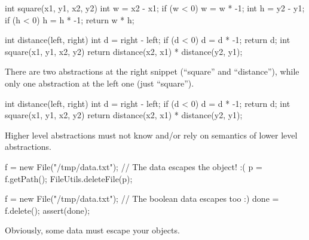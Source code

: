 \documentclass{article}
\begin{document}
\begin{pptWide}{2}
{\small\begin{ffcode}
int square(x1, y1, x2, y2) {
  int w = x2 - x1;
  if (w < 0) { w = w * -1; }
  int h = y2 - y1;
  if (h < 0) { h = h * -1; }
  return w * h;
}
\end{ffcode}
}
\par\columnbreak\par
{\small\begin{ffcode}
int distance(left, right) {
  int d = right - left;
  if (d < 0) { d = d * -1; }
  return d;
}
int square(x1, y1, x2, y2) {
  return distance(x2, x1)
    * distance(y2, y1);
}
\end{ffcode}
}
\end{pptWide}\par
There are two abstractions at the right snippet (``square'' and ``distance''), while only one abstraction at the left one (just ``square'').
\plush{}

\begin{pptWide}{2}
{\small\begin{ffcode}
int distance(left, right) {
  int d = right - left;
  if (d < 0) { d = d * -1; }
  return d;
}
int square(x1, y1, x2, y2) {
  return distance(x2, x1)
    * distance(y2, y1);
}
\end{ffcode}
}
\par\columnbreak\par
{}
\end{pptWide}\par
Higher level abstractions must not know and/or rely on semantics of lower level abstractions.
\plush{}

\begin{pptWide}{2}
{\small\begin{ffcode}
f = new File("/tmp/data.txt");
// The data escapes the object! :(
p = f.getPath();
FileUtils.deleteFile(p);
\end{ffcode}
}
\par\columnbreak\par
{\small\begin{ffcode}
f = new File("/tmp/data.txt");
// The boolean data escapes too :)
done = f.delete();
assert(done);
\end{ffcode}
}
\end{pptWide}
\par
Obviously, some data must escape your objects.
\plush{}
\end{document}
